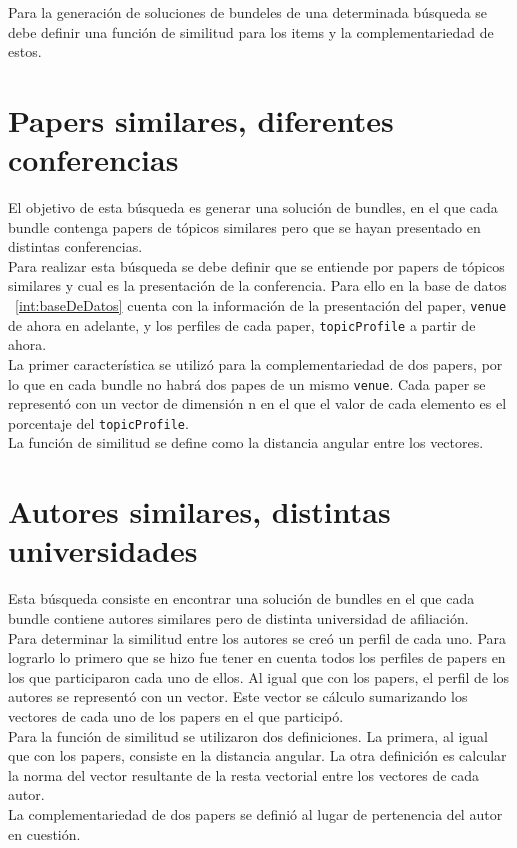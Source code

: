 Para la generación de soluciones de bundeles de una determinada búsqueda se debe definir una función de similitud para los items y la complementariedad
de estos. 
\section{Papers similares, diferentes conferencias}\label{bus:papSimDisLug}
El objetivo de esta búsqueda es generar una solución de bundles, en el que cada bundle contenga 
papers de tópicos similares pero que se hayan presentado en distintas conferencias.\\
Para realizar esta búsqueda se debe definir que se entiende por papers de tópicos similares y cual 
es la presentación de la conferencia. Para ello en la base de datos ~\ref{int:baseDeDatos} cuenta 
con la información de la presentación del paper, \texttt{venue} de ahora en adelante, y los 
perfiles de cada paper, \texttt{topicProfile} a partir de ahora.\\
La primer característica se utilizó para la complementariedad de dos papers, por lo que en cada 
bundle no habrá dos papes de un mismo \texttt{venue}. Cada paper se representó
con un vector de dimensión n en el que el valor de cada elemento es el porcentaje del \texttt{topicProfile}.\\ 
La función de similitud se define como la distancia angular entre los vectores.
\section{Autores similares, distintas universidades}
Esta búsqueda consiste en encontrar una solución de bundles en el que cada bundle contiene autores 
similares pero de distinta universidad de afiliación.\\
Para determinar la similitud entre los autores se creó un perfil de cada uno. Para lograrlo lo 
primero que se hizo fue tener en cuenta todos los perfiles de papers en los que participaron cada 
uno de ellos. Al igual que con los papers, el perfil de los autores se representó con un vector. 
Este vector se cálculo sumarizando los vectores de cada uno de los papers en el que participó.\\
Para la función de similitud se utilizaron dos definiciones. La primera, al igual que con los papers,
consiste en la distancia angular. La otra definición es calcular la norma del vector resultante de la resta
vectorial entre los vectores de cada autor.\\
La complementariedad de dos papers se definió al lugar de pertenencia del autor en cuestión.
